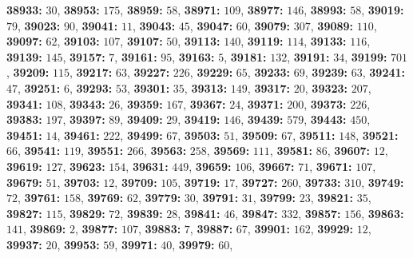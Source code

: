 \textsf{\bfseries 38933:} $30$, \textsf{\bfseries 38953:} $175$, \textsf{\bfseries 38959:} $58$, \textsf{\bfseries 38971:} $109$, \textsf{\bfseries 38977:} $146$, \textsf{\bfseries 38993:} $58$, \textsf{\bfseries 39019:} $79$, \textsf{\bfseries 39023:} $90$, \textsf{\bfseries 39041:} $11$, \textsf{\bfseries 39043:} $45$, \textsf{\bfseries 39047:} $60$, \textsf{\bfseries 39079:} $307$, \textsf{\bfseries 39089:} $110$, \textsf{\bfseries 39097:} $62$, \textsf{\bfseries 39103:} $107$, \textsf{\bfseries 39107:} $50$, \textsf{\bfseries 39113:} $140$, \textsf{\bfseries 39119:} $114$, \textsf{\bfseries 39133:} $116$, \textsf{\bfseries 39139:} $145$, \textsf{\bfseries 39157:} $7$, \textsf{\bfseries 39161:} $95$, \textsf{\bfseries 39163:} $5$, \textsf{\bfseries 39181:} $132$, \textsf{\bfseries 39191:} $34$, \textsf{\bfseries 39199:} $701$, \textsf{\bfseries 39209:} $115$, \textsf{\bfseries 39217:} $63$, \textsf{\bfseries 39227:} $226$, \textsf{\bfseries 39229:} $65$, \textsf{\bfseries 39233:} $69$, \textsf{\bfseries 39239:} $63$, \textsf{\bfseries 39241:} $47$, \textsf{\bfseries 39251:} $6$, \textsf{\bfseries 39293:} $53$, \textsf{\bfseries 39301:} $35$, \textsf{\bfseries 39313:} $149$, \textsf{\bfseries 39317:} $20$, \textsf{\bfseries 39323:} $207$, \textsf{\bfseries 39341:} $108$, \textsf{\bfseries 39343:} $26$, \textsf{\bfseries 39359:} $167$, \textsf{\bfseries 39367:} $24$, \textsf{\bfseries 39371:} $200$, \textsf{\bfseries 39373:} $226$, \textsf{\bfseries 39383:} $197$, \textsf{\bfseries 39397:} $89$, \textsf{\bfseries 39409:} $29$, \textsf{\bfseries 39419:} $146$, \textsf{\bfseries 39439:} $579$, \textsf{\bfseries 39443:} $450$, \textsf{\bfseries 39451:} $14$, \textsf{\bfseries 39461:} $222$, \textsf{\bfseries 39499:} $67$, \textsf{\bfseries 39503:} $51$, \textsf{\bfseries 39509:} $67$, \textsf{\bfseries 39511:} $148$, \textsf{\bfseries 39521:} $66$, \textsf{\bfseries 39541:} $119$, \textsf{\bfseries 39551:} $266$, \textsf{\bfseries 39563:} $258$, \textsf{\bfseries 39569:} $111$, \textsf{\bfseries 39581:} $86$, \textsf{\bfseries 39607:} $12$, \textsf{\bfseries 39619:} $127$, \textsf{\bfseries 39623:} $154$, \textsf{\bfseries 39631:} $449$, \textsf{\bfseries 39659:} $106$, \textsf{\bfseries 39667:} $71$, \textsf{\bfseries 39671:} $107$, \textsf{\bfseries 39679:} $51$, \textsf{\bfseries 39703:} $12$, \textsf{\bfseries 39709:} $105$, \textsf{\bfseries 39719:} $17$, \textsf{\bfseries 39727:} $260$, \textsf{\bfseries 39733:} $310$, \textsf{\bfseries 39749:} $72$, \textsf{\bfseries 39761:} $158$, \textsf{\bfseries 39769:} $62$, \textsf{\bfseries 39779:} $30$, \textsf{\bfseries 39791:} $31$, \textsf{\bfseries 39799:} $23$, \textsf{\bfseries 39821:} $35$, \textsf{\bfseries 39827:} $115$, \textsf{\bfseries 39829:} $72$, \textsf{\bfseries 39839:} $28$, \textsf{\bfseries 39841:} $46$, \textsf{\bfseries 39847:} $332$, \textsf{\bfseries 39857:} $156$, \textsf{\bfseries 39863:} $141$, \textsf{\bfseries 39869:} $2$, \textsf{\bfseries 39877:} $107$, \textsf{\bfseries 39883:} $7$, \textsf{\bfseries 39887:} $67$, \textsf{\bfseries 39901:} $162$, \textsf{\bfseries 39929:} $12$, \textsf{\bfseries 39937:} $20$, \textsf{\bfseries 39953:} $59$, \textsf{\bfseries 39971:} $40$, \textsf{\bfseries 39979:} $60$, 
